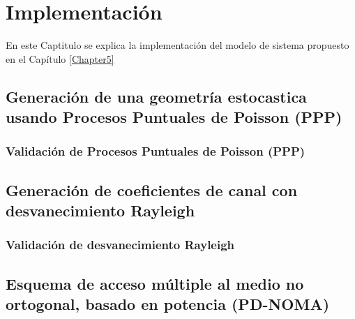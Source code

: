 
\chapter{Implementación} %

\label{Chapter6} %

En este Captitulo se explica la implementación del modelo de sistema propuesto en el Capítulo \ref{Chapter5}
\newline


\section{Generación de una geometría estocastica usando Procesos Puntuales de Poisson (PPP)}

\subsection{Validación de Procesos Puntuales de Poisson (PPP)}



\section{Generación de coeficientes de canal con desvanecimiento Rayleigh}

\subsection{Validación de desvanecimiento Rayleigh}



\section{Esquema de acceso múltiple al medio no ortogonal, basado en potencia (PD-NOMA)}

